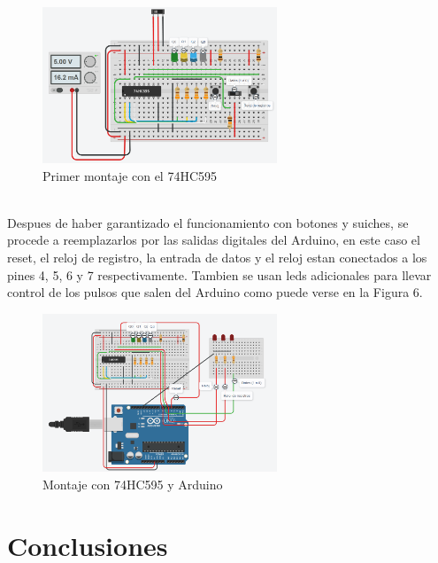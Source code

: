 \documentclass{article}
\begin{document}
\begin{figure}[h]
\includegraphics[width=7cm]{montaje0.PNG}
\centering
\caption{Primer montaje con el 74HC595}
\end{figure}\\

Despues de haber garantizado el funcionamiento con botones y suiches, se procede a reemplazarlos por las salidas digitales del Arduino, en este caso el reset, el reloj de registro, la entrada de datos y el reloj estan conectados a los pines 4, 5, 6 y 7 respectivamente. Tambien se usan leds adicionales para llevar control de los pulsos que salen del Arduino como puede verse en la Figura 6.

\begin{figure}[!ht]
\includegraphics[width=7cm]{montaje1.PNG}
\centering
\caption{Montaje con 74HC595 y Arduino}
\end{figure}



\section{Conclusiones} \label{conclusiones}




\end{document}
